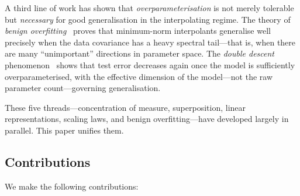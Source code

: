 \documentclass[11pt,a4paper]{article}
\theoremstyle{plain}
\theoremstyle{definition}
\theoremstyle{remark}
\begin{document}
A third line of work has shown that \emph{overparameterisation} is not merely
tolerable but \emph{necessary} for good generalisation in the interpolating
regime.  The theory of \emph{benign overfitting}~\citep{bartlett2020benign}
proves that minimum-norm interpolants generalise well precisely when the data
covariance has a heavy spectral tail---that is, when there are many
``unimportant'' directions in parameter space.  The \emph{double descent}
phenomenon~\citep{belkin2019reconciling} shows that test error decreases again
once the model is sufficiently overparameterised, with the effective dimension of
the model---not the raw parameter count---governing generalisation.

These five threads---concentration of measure, superposition, linear
representations, scaling laws, and benign overfitting---have developed largely in
parallel.  This paper unifies them.

\subsection{Contributions}

We make the following contributions:
\end{document}
